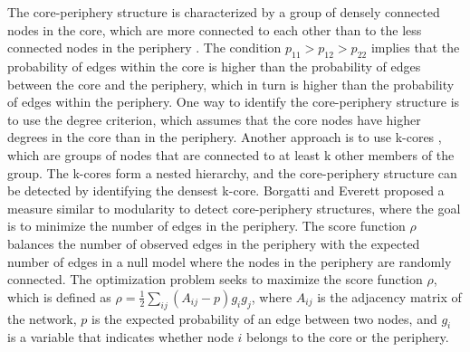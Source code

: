 The core-periphery structure is characterized by a group of densely connected nodes in the core, which are more connected to each other than to the less connected nodes in the periphery \cite{csermely2013structure, newman2010}. The condition $p_{11} > p_{12} > p_{22}$ implies that the probability of edges within the core is higher than the probability of edges between the core and the periphery, which in turn is higher than the probability of edges within the periphery. One way to identify the core-periphery structure is to use the degree criterion, which assumes that the core nodes have higher degrees in the core than in the periphery. Another approach is to use k-cores \cite{malliaros2020core}, which are groups of nodes that are connected to at least k other members of the group. The k-cores form a nested hierarchy, and the core-periphery structure can be detected by identifying the densest k-core. Borgatti and Everett \cite{borgatti2000models} proposed a measure similar to modularity to detect core-periphery structures, where the goal is to minimize the number of edges in the periphery. The score function $\rho$ balances the number of observed edges in the periphery with the expected number of edges in a null model where the nodes in the periphery are randomly connected. The optimization problem seeks to maximize the score function $\rho$, which is defined as $\rho = \frac{1}{2}\sum_{ij}(A_{ij}-p)g_ig_j$, where $A_{ij}$ is the adjacency matrix of the network, $p$ is the expected probability of an edge between two nodes, and $g_i$ is a variable that indicates whether node $i$ belongs to the core or the periphery.



